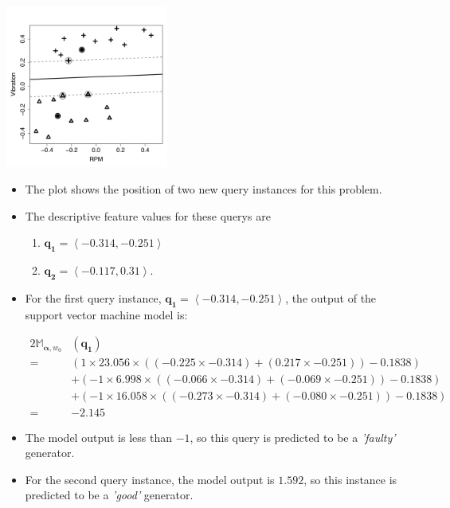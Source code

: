 \documentclass[xcolor={table}]{beamer}
\newcommand{\featL}[1]{\textit{'#1'}}
\begin{document}
 \begin{frame} 
 \begin{center}
 \includegraphics[width=0.4\textwidth]{./images/svmQueriesImage.pdf}
 \end{center}
  \begin{itemize}
\item The plot shows the position of two new query instances for this problem. 
\item The descriptive feature values for these querys are
\begin{enumerate}
	\item $\mathbf{q_1} = \left<-0.314, -0.251\right>$ 
	\item $\mathbf{q_2} = \left<-0.117, 0.31\right>$. 
\end{enumerate}
\end{itemize}
\end{frame}

\begin{frame}
\begin{itemize}
\item For the first query instance,  $\mathbf{q_1}= \left<-0.314, -0.251\right>$,  the output of the support vector machine model is:
\begin{footnotesize}
\begin{alignat*}{2}
\mathbb{M}_{\pmb{\alpha}, w_0}&(\mathbf{q_1}) \\
 = & \left(1 \times 23.056 \times \left(\left(-0.225 \times -0.314\right) + \left(0.217 \times -0.251\right)\right) -0.1838 \right) \\
 & + \left(-1 \times 6.998 \times \left(\left(-0.066 \times -0.314\right) + \left(-0.069 \times -0.251\right)\right) -0.1838 \right) \\
  & + \left(-1 \times 16.058 \times \left(\left(-0.273 \times -0.314\right) + \left(-0.080 \times -0.251\right)\right) -0.1838 \right) \\
   = & -2.145 
\end{alignat*}
\end{footnotesize}
\item The model output is less than $-1$, so this query is predicted to be a \featL{faulty} generator. 
\item For the second query instance, the model output is $1.592$, so this instance is predicted to be a \featL{good} generator.
\end{itemize}
\end{frame} 
\end{document}
